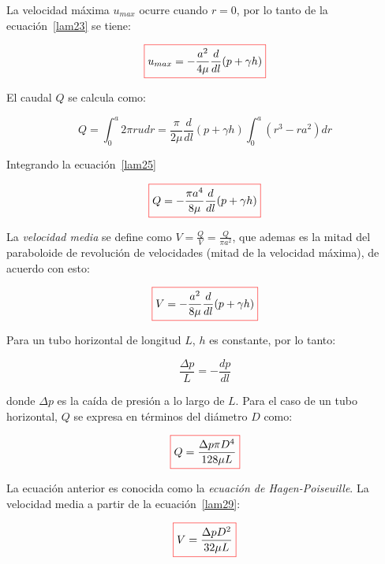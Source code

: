\documentclass[11pt, oneside]{article}
\begin{document}
La velocidad m\'axima $u_{max}$ ocurre cuando $r=0$, por lo tanto de la ecuaci\'on~\ref{lam23} se tiene:

\begin{equation}
\color{red}\boxed{\color{black} u_{max} = -\frac{a^2}{4\mu}\frac{d}{dl}(p + \gamma h) }
\label{lam24}
\end{equation}

El caudal $Q$ se calcula como:

\begin{equation}
 Q = \int_0^a 2\pi r u dr = \frac{\pi}{2\mu}\frac{d}{dl}(p + \gamma h) \int_0^a (r^3 -r a^2) dr 
\label{lam25}
\end{equation}

Integrando la ecuaci\'on~\ref{lam25}

\begin{equation}
\color{red}\boxed{\color{black} Q =  -\frac{\pi a^4}{8\mu}\frac{d}{dl}(p + \gamma h) }
\label{lam26}
\end{equation}

La \emph{velocidad media} se define como $V = \frac{Q}{V} = \frac{Q}{\pi a^2}$, que ademas es la mitad del paraboloide de revoluci\'on de velocidades (mitad de la velocidad m\'axima), de acuerdo con esto:
 
\begin{equation}
\color{red}\boxed{\color{black} V = -\frac{a^2}{8\mu}\frac{d}{dl}(p + \gamma h) }
\label{lam27}
\end{equation}

Para un tubo horizontal de longitud $L$, $h$ es constante, por lo tanto:

\begin{equation}
\frac{\Delta p}{L} = -\frac{dp}{dl}
\label{lam28}
\end{equation}

donde $\Delta p$ es la ca\'ida de presi\'on a lo largo de $L$. Para el caso de un tubo horizontal, $Q$ se expresa en t\'erminos del di\'ametro $D$ como:

\begin{equation}
\color{red}\boxed{\color{black} Q = \frac{\Delta p \pi D^4}{128 \mu L} }
\label{lam29}
\end{equation}

La ecuaci\'on anterior es conocida como la \emph{ecuaci\'on de Hagen-Poiseuille}. La velocidad media a partir de la ecuaci\'on~\ref{lam29}:

\begin{equation}
\color{red}\boxed{\color{black} V = \frac{\Delta p D^2}{32 \mu L} }
\label{lam30}
\end{equation}
\end{document}
